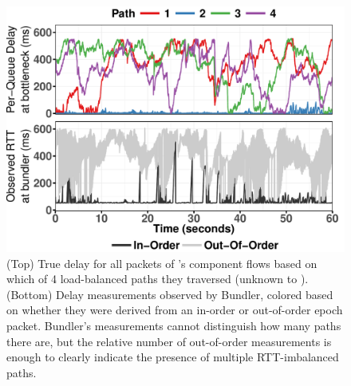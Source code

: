 
\begin{figure}
    \centering
\includegraphics[width=\maxwidth]{figure/ecmp_delay.pdf} 
\vspace{2pt}
\caption{(Top) True delay for all packets of \name's component flows based on which of 4 load-balanced paths they traversed (unknown to \name). (Bottom) Delay measurements observed by Bundler, colored based on whether they were derived from an in-order or out-of-order epoch packet. Bundler's measurements cannot distinguish how many paths there are, but the relative number of out-of-order measurements is enough to clearly indicate the presence of multiple RTT-imbalanced paths.}
\label{fig:queue-ctl:ecmp:motivation}
\end{figure}

